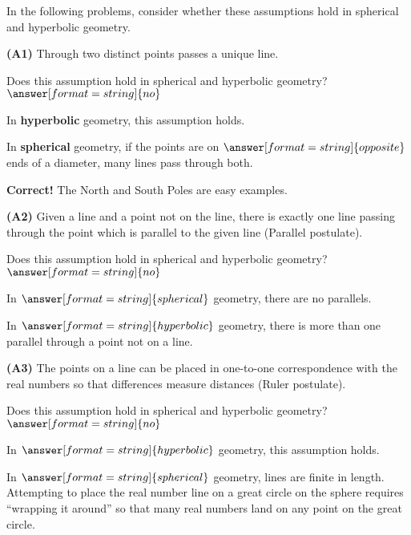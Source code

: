 \documentclass[nooutcomes]{ximera}
\begin{document}
In the following problems, consider whether these assumptions hold in spherical and hyperbolic geometry. 



\begin{problem}
\textbf{(A1)} Through two distinct points passes a unique line.

Does this assumption hold in spherical and hyperbolic geometry? 
$\answer[format=string]{no}$

\begin{problem}
In \textbf{hyperbolic} geometry, this assumption holds. 

In \textbf{spherical} geometry, if the points are on $\answer[format=string]{opposite}$ ends of a diameter, many lines pass through both.
\begin{feedback}[correct]
\textbf{Correct!} The North and South Poles are easy examples.  
\end{feedback}
\end{problem}
\end{problem}

\begin{problem}
\textbf{(A2)} Given a line and a point not on the line, there is exactly one line passing through the point which is parallel to the given line (Parallel postulate).

Does this assumption hold in spherical and hyperbolic geometry? 
$\answer[format=string]{no}$
\begin{problem}
In $\answer[format=string]{spherical}$ geometry, there are no parallels. 

In $\answer[format=string]{hyperbolic}$ geometry, there is more than one parallel through a point not on a line. 
\end{problem}
\end{problem}

\begin{problem}
\textbf{(A3)} The points on a line can be placed in one-to-one correspondence with the real numbers so that differences measure distances (Ruler postulate).  

Does this assumption hold in spherical and hyperbolic geometry? 
$\answer[format=string]{no}$

\begin{problem}
In $\answer[format=string]{hyperbolic}$ geometry, this assumption holds. 

In $\answer[format=string]{spherical}$ geometry, lines are finite in length.  Attempting to place the real number line on a great circle on the sphere requires ``wrapping it around'' so that many real numbers land on any point on the great circle.  
\end{problem}
\end{problem}
\end{document}
